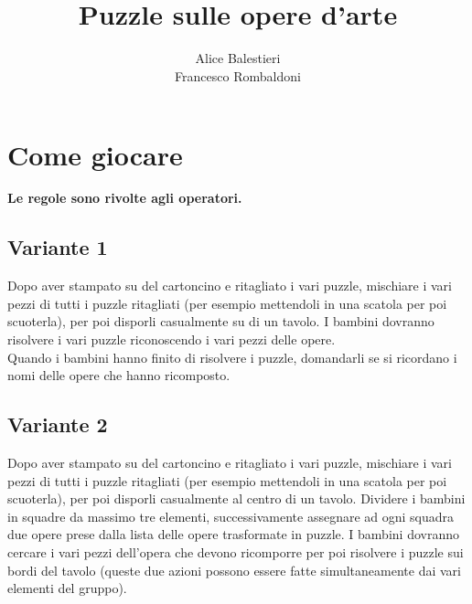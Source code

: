 \documentclass[hidelinks,12pt,a4paper]{article}
\begin{document}
	
	\title{\textbf{\\Puzzle sulle opere d'arte}}
	\author{Alice Balestieri\\Francesco Rombaldoni}
	\date{}
	
	\maketitle
	\newpage
	
	\tableofcontents
	\newpage
	
	\section{Come giocare}
	\begin{center}
		\textbf{Le regole sono rivolte agli operatori.}
	\end{center}
	
	\subsection{Variante 1}
	Dopo aver stampato su del cartoncino e ritagliato i vari puzzle, mischiare i vari pezzi di tutti i puzzle ritagliati (per esempio mettendoli in una scatola per poi scuoterla), per poi disporli casualmente su di un tavolo. I bambini dovranno risolvere i vari puzzle riconoscendo i vari pezzi delle opere.\\
	Quando i bambini hanno finito di risolvere i puzzle, domandarli se si ricordano i nomi delle opere che hanno ricomposto.
	
	\subsection{Variante 2}
	Dopo aver stampato su del cartoncino e ritagliato i vari puzzle, mischiare i vari pezzi di tutti i puzzle ritagliati (per esempio mettendoli in una scatola per poi scuoterla), per poi disporli casualmente al centro di un tavolo. Dividere i bambini in squadre da massimo tre elementi, successivamente assegnare ad ogni squadra due opere prese dalla lista delle opere trasformate in puzzle. I bambini dovranno cercare i vari pezzi dell'opera che devono ricomporre per poi risolvere i puzzle sui bordi del tavolo (queste due azioni possono essere fatte simultaneamente dai vari elementi del gruppo).
	
\end{document}

